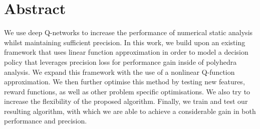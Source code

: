 
\chapter*{Abstract}
We use deep Q-networks to increase the performance of numerical static analysis whilst maintaining sufficient precision. In this work, we build upon an existing framework that uses linear function approximation in order to model a decision policy that leverages precision loss for performance gain inside of polyhedra analysis. We expand this framework with the use of a nonlinear Q-function approximation. We then further optimise this method by testing new features, reward functions, as well as other problem specific optimisations. We also try to increase the flexibility of the proposed algorithm. Finally, we train and test our resulting algorithm, with which we are able to achieve a considerable gain in both performance and precision.


